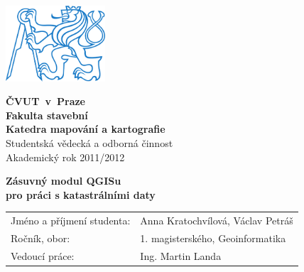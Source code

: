 \pagestyle{empty}
{
\newcommand{\napisCVUT}{ČVUT~v~Praze}
\newcommand{\napisFS}{Fakulta stavební}
\newcommand{\napisSVOC}{Studentská vědecká a odborná činnost}
\newcommand{\napisAK}{Akademický rok  2011/2012}
\newcommand{\napisObor}{Geoinformatika}
\newcommand{\napisKatedra}{Katedra mapování a kartografie}
\newcommand{\napisVedouci}{Ing. Martin Landa}
\newcommand{\napisAutor}{Anna Kratochvílová, Václav Petráš}
\newcommand{\napisRocnik}{1. magisterského}
\newcommand{\napisNazevI}{Zásuvný modul QGISu}
\newcommand{\napisNazevII}{pro práci s katastrálními daty}


\begin{minipage}{0.2\textwidth}
\includegraphics[width=3.7cm]{logo_cvut_modre}
\end{minipage}
\hfill
\begin{minipage}{0.7\textwidth}
\begin{flushright}
\textsf{
\textbf{
\Large
\napisCVUT\\
\napisFS\\
\napisKatedra\\
}
\Large
\napisSVOC\\
\napisAK
}
\end{flushright}
\end{minipage}


\begin{center}
\vfill
\textsf{
\textbf{
\Huge
\napisNazevI\\
\napisNazevII\\
}}
\vfill
\end{center}

\newcommand{\rtu}[2]{\textsf{#1}&\textsf{#2}\\}
\begin{tabular}{ll}
\rtu{Jméno a příjmení studenta:}{\napisAutor}
\rtu{Ročník, obor:}{\napisRocnik, \napisObor}
\rtu{Vedoucí práce:}{\napisVedouci}
\end{tabular}
}
